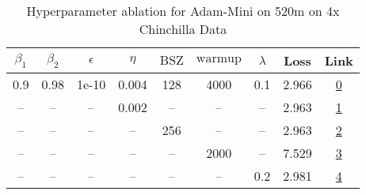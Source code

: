 \begin{table}[H]
\centering
\caption{Hyperparameter ablation for Adam-Mini on 520m on 4x Chinchilla Data}
\label{tab:ablation_adam-mini_520m_4}
\begin{tabular}{ccccccccc}
\toprule
$\beta_1$ & $\beta_2$ & $\epsilon$ & $\eta$ & $\mathrm{BSZ}$ & $\mathrm{warmup}$ & $\lambda$ & Loss & Link \\
\midrule
0.9 & 0.98 & 1e-10 & 0.004 & 128 & 4000 & 0.1 & 2.966 & \href{https://wandb.ai/stanford-mercury/optimizer-scaling/runs/sweep-520m-42B-minikdfe5aclr0.004-wd0.1-minlr0-warmup4000-b10.9--5de7af}{0} \\
\midrule
-- & -- & -- & 0.002 & -- & -- & -- & 2.963 & \href{https://wandb.ai/stanford-mercury/optimizer-scaling/runs/sweep-520m-42B-minik6bf656lr0.002-wd0.1-minlr0-warmup4000-b10.9--a9507c}{1} \\
-- & -- & -- & -- & 256 & -- & -- & 2.963 & \href{https://wandb.ai/stanford-mercury/optimizer-scaling/runs/sweep-520m-42B-minik4e584elr0.004-wd0.1-minlr0-warmup4000-b10.9--3eca5c}{2} \\
-- & -- & -- & -- & -- & 2000 & -- & 7.529 & \href{https://wandb.ai/stanford-mercury/optimizer-scaling/runs/sweep-520m-42B-minikb765f6lr0.004-wd0.1-minlr0-warmup2000-b10.9--520ca1}{3} \\
-- & -- & -- & -- & -- & -- & 0.2 & 2.981 & \href{https://wandb.ai/stanford-mercury/optimizer-scaling/runs/sweep-520m-42B-miniba6697lr0.004-wd0.2-minlr0-warmup4000-b10.9-b-2db890}{4} \\
\bottomrule
\end{tabular}
\end{table}


